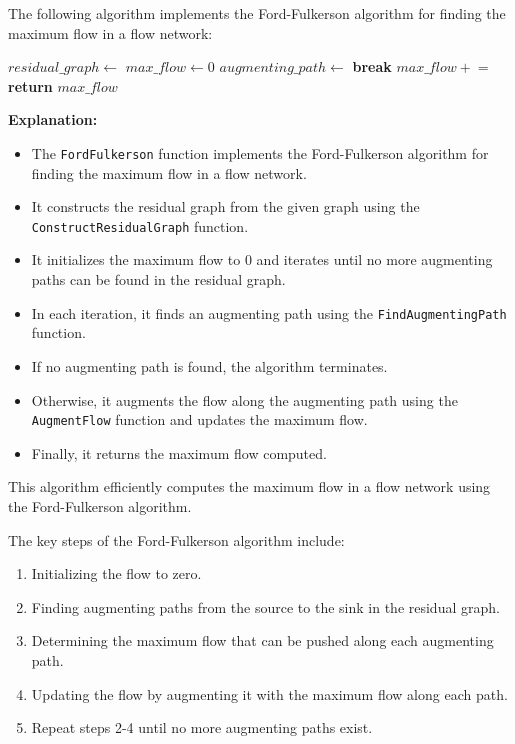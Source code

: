 \documentclass[12pt]{book} %
\begin{document}
The following algorithm implements the Ford-Fulkerson algorithm for finding the maximum flow in a flow network:
\FloatBarrier
\begin{algorithm}
\caption{Ford-Fulkerson Algorithm}\label{ford-fulkerson}
\begin{algorithmic}[1]
    \State $residual\_graph \gets$ 
    \State $max\_flow \gets 0$
        \State $augmenting\_path \gets$ 
            \State \textbf{break}
        \EndIf
        \State $max\_flow \mathrel{+}= $ 
    \EndWhile
    \State \textbf{return} $max\_flow$
\EndFunction
\end{algorithmic}
\end{algorithm}
\FloatBarrier
\textbf{Explanation:}
\begin{itemize}
    \item The \texttt{FordFulkerson} function implements the Ford-Fulkerson algorithm for finding the maximum flow in a flow network.
    \item It constructs the residual graph from the given graph using the \texttt{ConstructResidualGraph} function.
    \item It initializes the maximum flow to 0 and iterates until no more augmenting paths can be found in the residual graph.
    \item In each iteration, it finds an augmenting path using the \texttt{FindAugmentingPath} function.
    \item If no augmenting path is found, the algorithm terminates.
    \item Otherwise, it augments the flow along the augmenting path using the \texttt{AugmentFlow} function and updates the maximum flow.
    \item Finally, it returns the maximum flow computed.
\end{itemize}

This algorithm efficiently computes the maximum flow in a flow network using the Ford-Fulkerson algorithm.

The key steps of the Ford-Fulkerson algorithm include:
\begin{enumerate}
    \item Initializing the flow to zero.
    \item Finding augmenting paths from the source to the sink in the residual graph.
    \item Determining the maximum flow that can be pushed along each augmenting path.
    \item Updating the flow by augmenting it with the maximum flow along each path.
    \item Repeat steps 2-4 until no more augmenting paths exist.
\end{enumerate}
\end{document}
